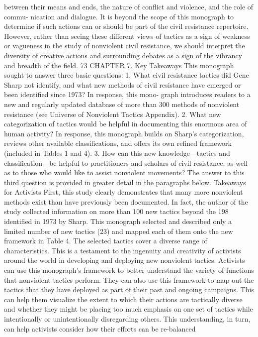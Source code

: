 \documentclass[twoside,a4paper,12pt,fleqn,openany]{extbook}
\begin{document}
between their means and ends, the nature of conflict and violence, and the role of commu-
nication and dialogue. It is beyond the scope of this monograph to determine if such actions
can or should be part of the civil resistance repertoire. However, rather than seeing these
different views of tactics as a sign of weakness or vagueness in the study of nonviolent civil
resistance, we should interpret the diversity of creative actions and surrounding debates as
a sign of the vibrancy and breadth of the field.
73
CHAPTER 7. Key Takeaways
This monograph sought to answer three basic questions:
1.	What civil resistance tactics did Gene Sharp not identify, and what new methods of
civil resistance have emerged or been identified since 1973? In response, this mono-
graph introduces readers to a new and regularly updated database of more than 300
methods of nonviolent resistance (see Universe of Nonviolent Tactics Appendix).
2.	 What new categorization of tactics would be helpful in documenting this enormous
area of human activity? In response, this monograph builds on Sharp’s categorization,
reviews other available classifications, and offers its own refined framework (included
in Tables 1 and 4).
3.	 How can this new knowledge—tactics and classification—be helpful to practitioners
and scholars of civil resistance, as well as to those who would like to assist nonviolent
movements? The answer to this third question is provided in greater detail in the
paragraphs below.
Takeaways for Activists
First, this study clearly demonstrates that many more nonviolent methods exist than have
previously been documented. In fact, the author of the study collected information on more
than 100 new tactics beyond the 198 identified in 1973 by Sharp.
This monograph selected and described only a limited number of new tactics (23) and
mapped each of them onto the new framework in Table 4. The selected tactics cover a diverse
range of characteristics. This is a testament to the ingenuity and creativity of activists around
the world in developing and deploying new nonviolent tactics.
Activists can use this monograph’s framework to better understand the variety of functions
that nonviolent tactics perform. They can also use this framework to map out the tactics that
they have deployed as part of their past and ongoing campaigns. This can help them visualize
the extent to which their actions are tactically diverse and whether they might be placing too
much emphasis on one set of tactics while intentionally or unintentionally disregarding others.
This understanding, in turn, can help activists consider how their efforts can be re-balanced
\end{document}
